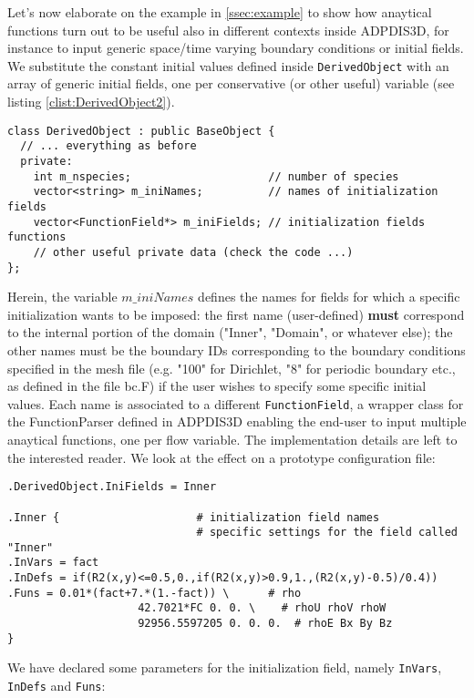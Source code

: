 \documentclass[11pt]{article}
\newcommand{\noi}{\noindent}
\begin{document}
Let's now elaborate on the example in \ref{ssec:example} to show how anaytical
functions turn out to be useful also in different contexts inside 
ADPDIS3D, for instance to input generic space/time varying boundary 
conditions or initial fields. We substitute the constant initial 
values defined inside \texttt{DerivedObject} with an array of generic 
initial fields, one per conservative (or other useful) variable (see
listing \ref{clist:DerivedObject2}).
\begin{lstlisting}[basicstyle={\small\sffamily},float=!htb,caption={DerivedObject
    class definition 2.}, label=clist:DerivedObject2]
class DerivedObject : public BaseObject {
  // ... everything as before
  private:
    int m_nspecies;                     // number of species
    vector<string> m_iniNames;          // names of initialization fields
    vector<FunctionField*> m_iniFields; // initialization fields functions
    // other useful private data (check the code ...)
};
\end{lstlisting}
\noi
Herein, the variable $m\_iniNames$ defines the names for fields for
which a specific initialization wants to be imposed: the first name
(user-defined) {\bf must} correspond to the internal portion of the 
domain ("Inner", "Domain", or whatever else);
the other names must be the boundary IDs corresponding to the
boundary conditions specified in the mesh file (e.g. "100" for
Dirichlet, "8" for periodic boundary etc., as defined in the file
bc.F) if the user wishes to specify some specific initial values. Each name
is associated to a different \texttt{FunctionField}, 
a wrapper class for the  FunctionParser \cite{FParser} defined in 
ADPDIS3D enabling the end-user to input multiple anaytical functions, 
one per flow variable. The implementation details are left to the 
interested reader. We look at the effect on a prototype
configuration file:
\begin{verbatim}
.DerivedObject.IniFields = Inner 

.Inner {                     # initialization field names
                             # specific settings for the field called "Inner"
.InVars = fact
.InDefs = if(R2(x,y)<=0.5,0.,if(R2(x,y)>0.9,1.,(R2(x,y)-0.5)/0.4))
.Funs = 0.01*(fact+7.*(1.-fact)) \      # rho
                 	42.7021*FC 0. 0. \    # rhoU rhoV rhoW
	                92956.5597205 0. 0. 0.  # rhoE Bx By Bz
}
\end{verbatim}
We have declared some parameters for the initialization field, namely
\texttt{InVars}, \texttt{InDefs} and \texttt{Funs}:
\end{document}
